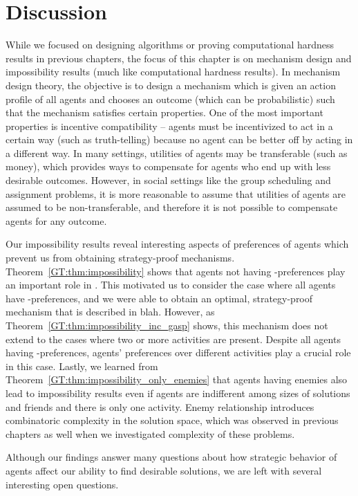 \section{Discussion}

While we focused on designing algorithms or proving computational hardness results in previous chapters, the focus of this chapter is on mechanism design and impossibility results (much like computational hardness results). In mechanism design theory, the objective is to design a mechanism which is given an action profile of all agents and chooses an outcome (which can be probabilistic) such that the mechanism satisfies certain properties. One of the most important properties is incentive compatibility -- agents must be incentivized to act in a certain way (such as truth-telling) because no agent can be better off by acting in a different way. In many settings, utilities of agents may be transferable (such as money), which provides ways to compensate for agents who end up with less desirable outcomes. However, in social settings like the group scheduling and assignment problems, it is more reasonable to assume that utilities of agents are assumed to be non-transferable, and therefore it is not possible to compensate agents for any outcome. 

Our impossibility results reveal interesting aspects of preferences of agents which prevent us from obtaining strategy-proof mechanisms.  Theorem~\ref{GT:thm:impossibility} shows that agents not having \INC-preferences play an important role in \AOIP. This motivated us to consider the case where all agents have \INC-preferences, and we were able to obtain an optimal, strategy-proof mechanism that is described in blah.
However, as Theorem~\ref{GT:thm:impossibility_inc_gasp} shows, this mechanism does not extend to the cases where two or more activities are present. Despite all agents having \INC-preferences, agents' preferences over different activities play a crucial role in this case. Lastly, we learned from Theorem~\ref{GT:thm:impossibility_only_enemies} that agents having enemies also lead to impossibility results even if agents are indifferent among sizes of solutions and friends and there is only one activity. Enemy relationship introduces combinatoric complexity in the solution space, which was observed in previous chapters as well when we investigated complexity of these problems.

Although our findings answer many questions about how strategic behavior of agents affect our ability to find desirable solutions, we are left with several interesting open questions. %


